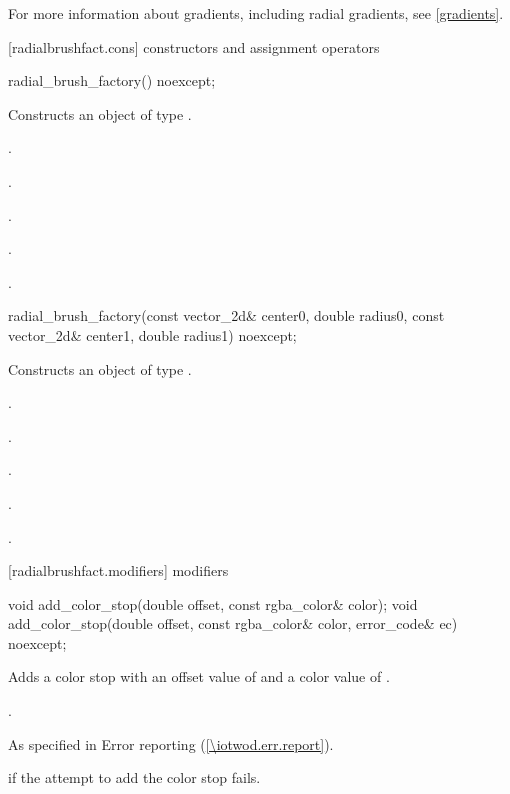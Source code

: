 \pnum
For more information about gradients, including radial gradients, see \ref{gradients}.

 [radialbrushfact.cons] { constructors and assignment operators}

\begin{itemdecl}
    radial_brush_factory() noexcept;
\end{itemdecl}
\begin{itemdescr}
	\pnum
	\effects
	Constructs an object of type .
	
	\pnum
	\postconditions
	.

	\pnum
	.

	\pnum
	.
	
	\pnum
	.

	\pnum
	.
	
\end{itemdescr}

\begin{itemdecl}
    radial_brush_factory(const vector_2d& center0, double radius0,
      const vector_2d& center1, double radius1) noexcept;
\end{itemdecl}
\begin{itemdescr}
	\pnum
	\effects
	Constructs an object of type .
	
	\pnum
	\postconditions
	.

	\pnum
	.

	\pnum
	.
	
	\pnum
	.

	\pnum
	.
	
\end{itemdescr}

 [radialbrushfact.modifiers] { modifiers}

\begin{itemdecl}
    void add_color_stop(double offset, const rgba_color& color);
    void add_color_stop(double offset, const rgba_color& color,
      error_code& ec) noexcept;
\end{itemdecl}
\begin{itemdescr}
	\pnum
	\effects
	Adds a color stop with an offset value of  and a color value of .
	
	\pnum
	\postconditions
	.
	
	\pnum
	\throws
	As specified in Error reporting (\ref{\iotwod.err.report}).
	
	\pnum
	\errors
	 if the attempt to add the color stop fails.
	
\end{itemdescr}

